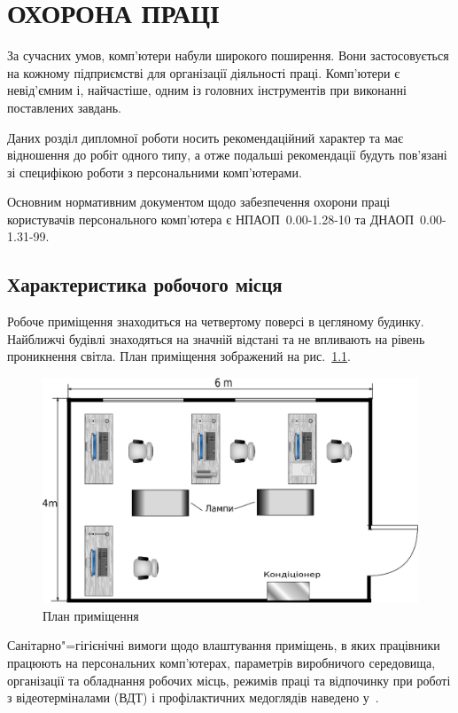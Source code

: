 \documentclass{diploma}
\begin{document}
\chapter{ОХОРОНА ПРАЦІ}
  За сучасних умов, комп’ютери набули широкого поширення.
  Вони застосовується на кожному підприємстві для організації діяльності
  праці.
  Комп’ютери є невід’ємним і, найчастіше, одним із головних інструментів при
  виконанні поставлених завдань.

  Даних розділ дипломної роботи носить рекомендаційний характер та має
  відношення до робіт одного типу, а отже подальші рекомендації будуть
  пов’язані зі специфікою роботи з персональними комп’ютерами.

  Основним нормативним документом щодо забезпечення охорони праці користувачів
  персонального комп’ютера є НПАОП~0.00-1.28-10\cite{npaop128} та
  ДНАОП~0.00-1.31-99\cite{dnaop131}.
  \section{Характеристика робочого місця}
    Робоче приміщення знаходиться на четвертому поверсі в цегляному будинку.
    Найближчі будівлі знаходяться на значній відстані та не впливають на
    рівень проникнення світла.
    План приміщення зображений на рис.~\ref{fig:plan}.
    \begin{figure}[ht]
      \centering
      \includegraphics[width=\linewidth]{plan2.eps}
      \caption{План приміщення}
      \label{fig:plan}
    \end{figure}

    Санітарно"=гігієнічні вимоги щодо влаштування приміщень, в яких працівники
    працюють на персональних комп’ютерах, параметрів виробничого середовища,
    організації та обладнання робочих місць, режимів праці та відпочинку при
    роботі з відеотерміналами (ВДТ) і профілактичних медоглядів наведено
    у~\cite{npaop128}.
\end{document}
